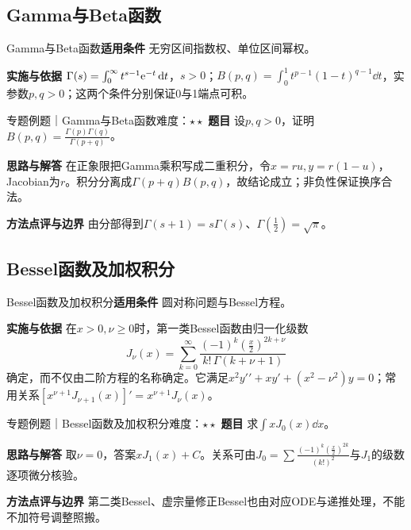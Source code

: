 \subsection{Gamma与Beta函数}\label{mat:special_integrals:gamma}
\begin{method}{Gamma与Beta函数}\textbf{适用条件} 无穷区间指数权、单位区间幂权。\par\textbf{实施与依据} $\Gamma(s)=\int_0^\infty t^{s-1}\mathrm{e}^{-t}\mathop{}\!\mathrm{d} t$，$s>0$；$B(p,q)=\int_0^1t^{p-1}(1-t)^{q-1}\dd t$，实参数$p,q>0$；这两个条件分别保证0与1端点可积。\end{method}
\begin{example}{专题例题｜Gamma与Beta函数}{难度：$\star\star$}
\textbf{题目} 设$p,q>0$，证明$B(p,q)=\frac{\Gamma(p)\Gamma(q)}{\Gamma(p+q)}$。\par\textbf{思路与解答} 在正象限把Gamma乘积写成二重积分，令$x=ru,y=r(1-u)$，Jacobian为$r$。积分分离成$\Gamma(p+q)B(p,q)$，故结论成立；非负性保证换序合法。\par\textbf{方法点评与边界} 由分部得到$\Gamma(s+1)=s\Gamma(s)$、$\Gamma(\frac{1}{2})=\sqrt\pi$。
\end{example}
\subsection{Bessel函数及加权积分}\label{mat:special_integrals:bessel}
\begin{method}{Bessel函数及加权积分}\textbf{适用条件} 圆对称问题与Bessel方程。\par\textbf{实施与依据} 在$x>0,\nu\ge0$时，第一类Bessel函数由归一化级数
\[
J_\nu(x)=\sum_{k=0}^\infty
\dfrac{(-1)^k(\frac{x}{2})^{2k+\nu}}{k!\,\Gamma(k+\nu+1)}
\]
确定，而不仅由二阶方程的名称确定。它满足$x^2y\prime\prime+xy\prime+(x^2-\nu^2)y=0$；常用关系$[x^{\nu+1}J_{\nu+1}(x)]\prime=x^{\nu+1}J_\nu(x)$。\end{method}
\begin{example}{专题例题｜Bessel函数及加权积分}{难度：$\star\star$}
\textbf{题目} 求$\int xJ_0(x)\dd x$。\par\textbf{思路与解答} 取$\nu=0$，答案$xJ_1(x)+C$。关系可由$J_0=\sum\frac{(-1)^k(\frac{x}{2})^{2k}}{(k!)^2}$与$J_1$的级数逐项微分核验。\par\textbf{方法点评与边界} 第二类Bessel、虚宗量修正Bessel也由对应ODE与递推处理，不能不加符号调整照搬。
\end{example}
